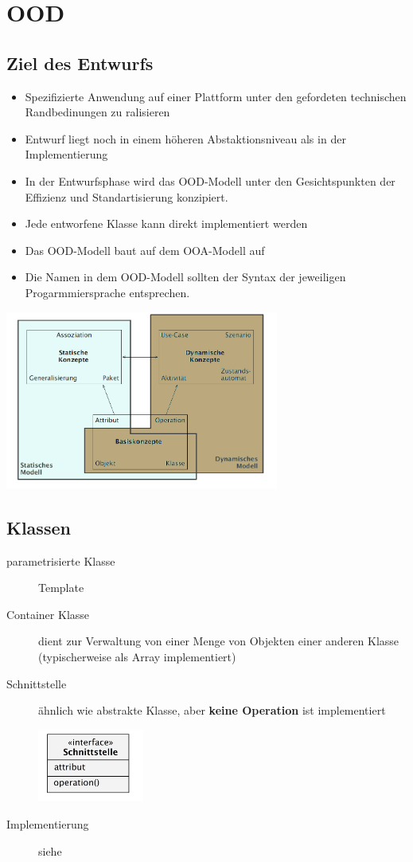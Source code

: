 \section{OOD}
\subsection{Ziel des Entwurfs}
  \begin{itemize}[leftmargin=0.5cm]
    \item Spezifizierte Anwendung auf einer Plattform unter den gefordeten technischen
      Randbedinungen zu ralisieren
    \item Entwurf liegt noch in einem höheren Abstaktionsniveau als in der Implementierung
    \item In der Entwurfsphase wird das OOD-Modell unter den Gesichtspunkten
      der Effizienz und Standartisierung konzipiert.
    \item Jede entworfene Klasse kann direkt implementiert werden
    \item Das OOD-Modell baut auf dem OOA-Modell auf
    \item Die Namen in dem OOD-Modell sollten der Syntax der jeweiligen Progarmmiersprache
      entsprechen.
  \end{itemize}

  \parbox{9cm}{\includegraphics[width=9cm]{./bilder/Konzepte.png}}
  
\subsection{Klassen }
  \begin{description}
    \item[parametrisierte Klasse]
      Template
    \item[Container Klasse]
      dient zur Verwaltung von einer Menge von Objekten einer anderen Klasse
      (typischerweise als Array implementiert)
    \item[Schnittstelle]
      \parbox{5cm}{ähnlich wie abstrakte Klasse, aber \textbf{keine Operation} ist implementiert}
      \hspace{0.5cm}
      \parbox{3.5cm}{\includegraphics[width=3.5cm]{./bilder/Schnittstelle.png}}
    \item[Implementierung]
      siehe 
  \end{description}
  

